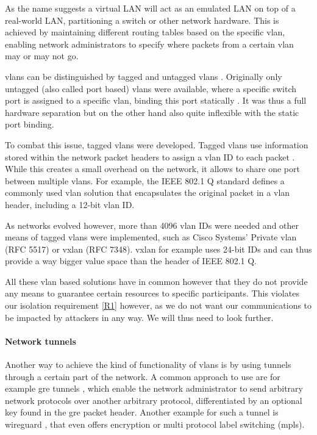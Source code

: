 As the name suggests a virtual LAN will act as an emulated LAN on top of a real-world LAN, partitioning a switch or other network hardware. This is achieved by maintaining different routing tables based on the specific \acrshort{vlan}, enabling network administrators to specify where packets from a certain \acrshort{vlan} may or may not go.

\acrshort{vlan}s can be distinguished by tagged and untagged \acrshort{vlan}s \cite[25.2]{IEEE8021Q}. Originally only untagged (also called port based) \acrshort{vlan}s were available, where a specific switch port is assigned to a specific \acrshort{vlan}, binding this port statically \cite[25.3]{IEEE8021Q}. It was thus a full hardware separation but on the other hand also quite inflexible with the static port binding.

To combat this issue, tagged \acrshort{vlan}s were developed. Tagged \acrshort{vlan}s use information stored within the network packet headers to assign a \acrshort{vlan} ID to each packet \cite{IEEE8021Q}. While this creates a small overhead on the network, it allows to share one port between multiple \acrshort{vlan}s. For example, the IEEE 802.1 Q standard defines a commonly used \acrshort{vlan} solution that encapsulates the original packet in a \acrshort{vlan} header, including a 12-bit \acrshort{vlan} ID.

As networks evolved however, more than 4096 \acrshort{vlan} IDs were needed and other means of tagged \acrshort{vlan}s were implemented, such as Cisco Systems' Private \acrshort{vlan} (RFC 5517) \cite{rfc5517} or \acrshort{vxlan} (RFC 7348). \acrshort{vxlan} for example uses 24-bit IDs and can thus provide a way bigger value space than the header of IEEE 802.1 Q.

All these \acrshort{vlan} based solutions have in common however that they do not provide any means to guarantee certain resources to specific participants. This violates our isolation requirement \ref{R1} however, as we do not want our communications to be impacted by attackers in any way. We will thus need to look further.

\paragraph{Network tunnels} Another way to achieve the kind of functionality of \acrshort{vlan}s is by using tunnels through a certain part of the network. A common approach to use are for example \acrshort{gre} tunnels \cite{rfc2784}, which enable the network administrator to send arbitrary network protocols over another arbitrary protocol, differentiated by an optional key found in the \acrshort{gre} packet header. Another example for such a tunnel is \gls{wireguard} \cite{wireguard}, that even offers encryption or multi protocol label switching (\acrshort{mpls}).

